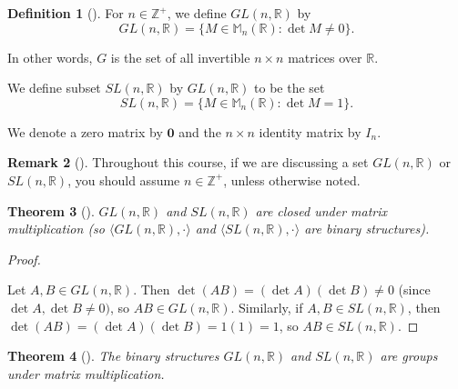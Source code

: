 \documentclass[10pt,]{book}
\theoremstyle{plain}
\newtheorem{theorem}{Theorem}[section]
\theoremstyle{definition}
\newtheorem{definition}[theorem]{Definition}
\theoremstyle{definition}
\newtheorem{remark}[theorem]{Remark}
\theoremstyle{definition}
\theoremstyle{definition}
\numberwithin{equation}{section}
\def\Z{\mathbb{Z}}
\def\R{\mathbb{R}}
\def\M{\mathbb{M}}
\def\0{\mathbf 0}
\begin{document}
\begin{definition}[{}]\label{definition-20}
For \(n\in \Z^+\), we define \(GL(n,\R)\) by%
\begin{equation*}
GL(n,\R)=\{M\in \M_n(\R):\det M \neq 0\}.
\end{equation*}
%
\par
In other words, \(G\) is the set of all invertible \(n\times n\) matrices over \(\R\).%
\par
We  define subset \(SL(n,\R)\) by \(GL(n,\R)\) to be the set%
\begin{equation*}
SL(n,\R)=\{M\in \M_n(\R):\det M =1\}.
\end{equation*}
%
\par
We denote a zero matrix by  \(\0\) and the  \(n\times n\) identity matrix by  \(I_n\).%
\end{definition}
\begin{remark}[]\label{remark-8}
Throughout this course, if we are discussing a set \(GL(n,\R)\) or \(SL(n,\R)\), you should assume \(n\in \Z^+\), unless otherwise noted.%
\end{remark}
\begin{theorem}[{}]\label{glsl}
\(GL(n,\R)\) and \(SL(n,\R)\) are closed under matrix multiplication (so \(\langle GL(n,\R),\cdot\rangle\) and \(\langle SL(n,\R),\cdot\rangle\) are binary structures).%
\end{theorem}
\begin{proof}\hypertarget{proof-7}{}
Let \(A,B\in GL(n, \R)\). Then \(\det(AB)=(\det A)(\det B) \neq 0\) (since \(\det A, \det B \neq 0)\), so \(AB\in GL(n,\R)\). Similarly, if \(A,B \in SL(n,\R)\), then \(\det(AB)=(\det A)(\det B)=1(1)=1\), so \(AB\in SL(n,\R)\).%
\end{proof}
\begin{theorem}[{}]\label{theorem-8}
The binary structures \(GL(n,\R)\) and \(SL(n,\R)\) are groups under matrix multiplication.%
\end{theorem}
\end{document}

